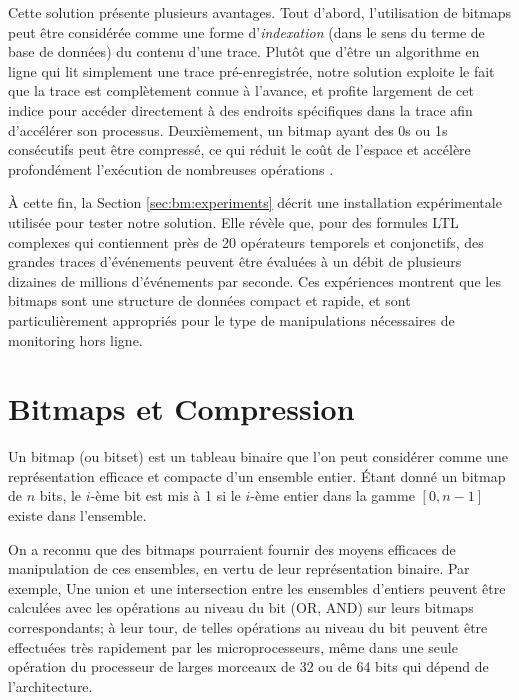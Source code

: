Cette solution présente plusieurs avantages. Tout d'abord, l'utilisation de bitmaps peut être considérée comme une forme d'\emph{indexation} (dans le sens du terme de base de données) du contenu d'une trace. Plutôt que d'être un algorithme en ligne qui lit simplement une trace pré-enregistrée, notre solution exploite le fait que la trace est complètement connue à l'avance, et profite largement de cet indice pour accéder directement à des endroits spécifiques dans la trace afin d'accélérer son processus. Deuxièmement, un bitmap ayant des 0s ou 1s consécutifs peut être compressé, ce qui réduit le coût de l'espace et accélère profondément l'exécution de nombreuses opérations \citep{lemire2014}.

À cette fin, la Section \ref{sec:bm:experiments} décrit une installation expérimentale utilisée pour tester notre solution. Elle révèle que, pour des formules LTL complexes qui contiennent près de 20 opérateurs temporels et conjonctifs, des grandes traces d'événements peuvent être évaluées à un débit de plusieurs dizaines de millions d'événements par seconde. Ces expériences montrent que les bitmaps sont une structure de données compact et rapide, et sont particulièrement appropriés pour le type de manipulations nécessaires de monitoring hors ligne.

\section{Bitmaps et Compression}\label{sec:bm:compression} %

Un bitmap (ou bitset) est un tableau binaire que l'on peut considérer comme une représentation efficace et compacte d'un ensemble entier. Étant donné un bitmap de $n$ bits, le $i$-ème bit est mis à 1 si le $i$-ème entier dans la gamme $[0, n-1]$ existe dans l'ensemble.

On a reconnu que des bitmaps pourraient fournir des moyens efficaces de manipulation de ces ensembles, en vertu de leur représentation binaire. Par exemple, Une union et une intersection entre les ensembles d'entiers peuvent être calculées avec les opérations au niveau du bit (OR, AND) sur leurs bitmaps correspondants; à leur tour, de telles opérations au niveau du bit peuvent être effectuées très rapidement par les microprocesseurs, même dans une seule opération du processeur de larges morceaux de 32 ou de 64 bits qui dépend de l'architecture.

